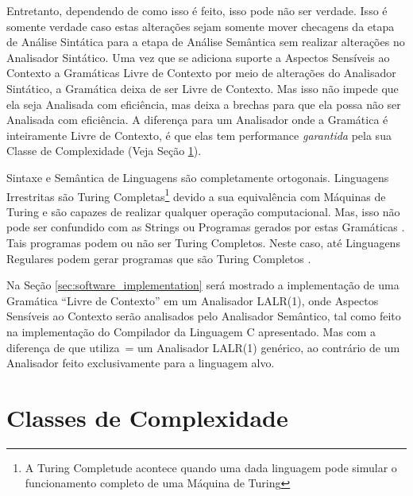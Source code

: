 {    Entretanto,
    dependendo de como isso é feito,
    isso pode não ser verdade.
    Isso é somente verdade caso estas alterações sejam somente mover
    checagens da etapa de Análise Sintática para a etapa de Análise
    Semântica sem realizar alterações no Analisador Sintático.
    Uma vez que se adiciona suporte a Aspectos Sensíveis ao Contexto \cite{contextSensitiveParsing}
    a Gramáticas Livre de Contexto por meio de alterações do Analisador Sintático,
    a Gramática deixa de ser Livre de Contexto.
    Mas isso não impede que ela seja Analisada com eficiência,
    mas deixa a brechas para que ela possa não ser Analisada com eficiência.
    A diferença para um Analisador onde a Gramática é inteiramente Livre de Contexto,
    é que elas tem performance \textit{garantida} pela sua Classe
    de Complexidade (Veja Seção \ref{classesDeComplexidade}).

    Sintaxe e
    Semântica de Linguagens são completamente ortogonais.
    Linguagens Irrestritas são Turing Completas\footnote{A Turing Completude acontece quando
    uma dada linguagem pode simular o funcionamento completo de uma Máquina de Turing}
    devido a sua equivalência com Máquinas de Turing  e
    são capazes de realizar qualquer operação computacional.
    Mas,
    isso não pode ser confundido com as Strings ou Programas gerados por
    estas Gramáticas \cite{areThereDomainSpecificLanguages}.
    Tais programas podem ou não ser Turing Completos.
    Neste caso,
    até Linguagens Regulares podem gerar programas que são
    Turing Completos \cite{turingCompleteRegularLanguages}.

    Na Seção \ref{sec:software_implementation} será mostrado a implementação de
    uma Gramática ``Livre de Contexto'' em um Analisador LALR(1),
    onde Aspectos Sensíveis ao Contexto serão analisados pelo Analisador Semântico,
    tal como feito na implementação do Compilador da Linguagem C apresentado.
    Mas com a diferença de que utiliza~= um Analisador LALR(1) genérico,
    ao contrário de um Analisador feito exclusivamente para a linguagem alvo.


\section{Classes de Complexidade}
\label{classesDeComplexidade}

}

